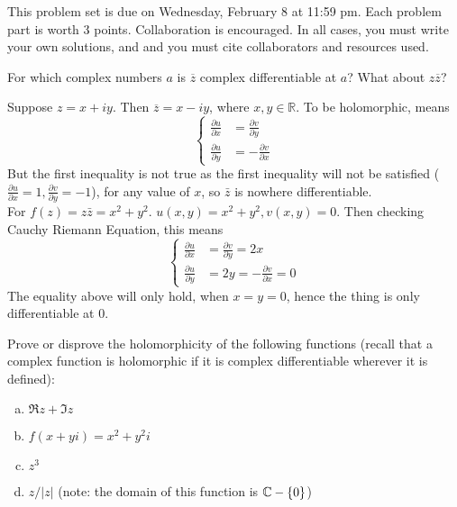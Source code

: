 \maketitle

This problem set is due on Wednesday, February 8 at 11:59 pm. Each problem part is worth 3 points. Collaboration is encouraged. In all cases, you must write your own solutions, and and you must cite collaborators and resources used.

\begin{problem}
  For which complex numbers $a$ is $\overline z$ complex differentiable at $a$? What about $z\overline z$?
\end{problem}
\begin{solution}
Suppose $z = x + iy$. Then $\overline{z} = x - iy$, where $x,y \in \mathbb{R}$. To be holomorphic, means \[
\begin{cases}
	\frac{\partial u}{\partial x} &=\frac{\partial v}{\partial y}\\
	\frac{\partial u}{\partial y} &=-\frac{\partial v}{\partial x}
\end{cases}\]
But the first inequality is not true as the first inequality will not be satisfied ($\frac{\partial u}{\partial x} = 1, \frac{\partial v}{\partial y}= -1$), for any value of $x$, so $\bar{z}$ is nowhere differentiable.\\
For $f(z) = z\bar{z} = x^2 + y^2$. $u(x,y) = x^2 + y^2, v(x,y) = 0$. Then checking Cauchy Riemann Equation, this means \[
\begin{cases}
	\frac{\partial u}{\partial x} &=\frac{\partial v}{\partial y} = 2x\\
	\frac{\partial u}{\partial y} &=2y=-\frac{\partial v}{\partial x}=0
\end{cases}\]
The equality above will only hold, when $x = y = 0$, hence the thing is only differentiable at 0.
\end{solution}
\begin{problem}
  Prove or disprove the holomorphicity of the following functions (recall that a complex function is holomorphic if it is complex differentiable wherever it is defined):
  \begin{enumerate}[(a)]
    \item $\Re z+\Im z$
    \item $f(x+yi)=x^2+y^2i$
    \item $z^3$
    \item $z/|z|$ (note: the domain of this function is $\mathbb{C}-\{0\}$)
  \end{enumerate}
\end{problem}

